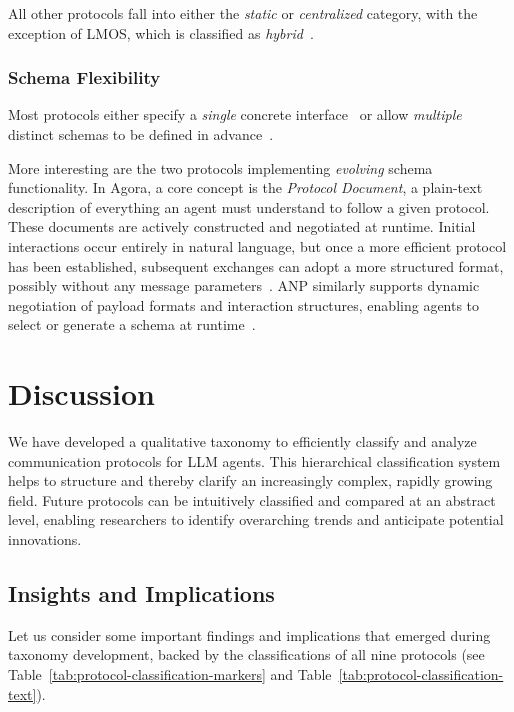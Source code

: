 \documentclass[pdflatex,sn-mathphys-num]{sn-jnl}%
\theoremstyle{thmstyleone}%
\theoremstyle{thmstyletwo}%
\theoremstyle{thmstylethree}%
\begin{document}
All other protocols fall into either the \textit{static} or \textit{centralized} category, with the exception of LMOS, which is classified as \textit{hybrid}~\cite{lmosdiscovery}.

\subsubsection{Schema Flexibility}

Most protocols either specify a \textit{single} concrete interface~\cite{lapdocsapi,agentsjsonschema} or allow \textit{multiple} distinct schemas to be defined in advance~\cite{mcpdocscorearchitecture,lmosintroduction,agntcyconnectprotocol}.

More interesting are the two protocols implementing \textit{evolving} schema functionality. In Agora, a core concept is the \textit{Protocol Document}, a plain-text description of everything an agent must understand to follow a given protocol. These documents are actively constructed and negotiated at runtime. Initial interactions occur entirely in natural language, but once a more efficient protocol has been established, subsequent exchanges can adopt a more structured format, possibly without any message parameters~\cite{marro2024scalable}. ANP similarly supports dynamic negotiation of payload formats and interaction structures, enabling agents to select or generate a schema at runtime~\cite{anpcommunication}.

\section{Discussion}\label{discussion}

We have developed a qualitative taxonomy to efficiently classify and analyze communication protocols for LLM agents. This hierarchical classification system helps to structure and thereby clarify an increasingly complex, rapidly growing field. Future protocols can be intuitively classified and compared at an abstract level, enabling researchers to identify overarching trends and anticipate potential innovations.

\subsection{Insights and Implications} \label{sec:insights}

Let us consider some important findings and implications that emerged during taxonomy development, backed by the classifications of all nine protocols (see Table~\ref{tab:protocol-classification-markers} and Table~\ref{tab:protocol-classification-text}).
\end{document}
